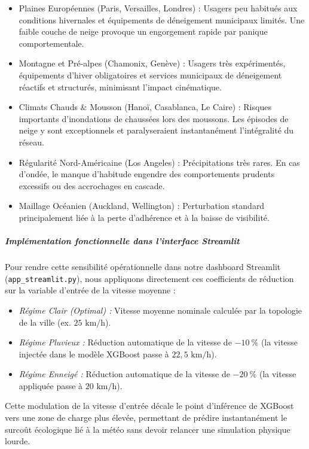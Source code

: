 \documentclass[10pt, a4paper]{article}
\providecommand{\tightlist}{}
\begin{document}
\begin{itemize}
\tightlist
\item
  Plaines Européennes (Paris, Versailles, Londres) : Usagers peu
  habitués aux conditions hivernales et équipements de déneigement
  municipaux limités. Une faible couche de neige provoque un engorgement
  rapide par panique comportementale.
\item
  Montagne et Pré-alpes (Chamonix, Genève) : Usagers très expérimentés,
  équipements d'hiver obligatoires et services municipaux de déneigement
  réactifs et structurés, minimisant l'impact cinématique.
\item
  Climats Chauds \& Mousson (Hanoï, Casablanca, Le Caire) : Risques
  importants d'inondations de chaussées lors des moussons. Les épisodes
  de neige y sont exceptionnels et paralyseraient instantanément
  l'intégralité du réseau.
\item
  Régularité Nord-Américaine (Los Angeles) : Précipitations très rares.
  En cas d'ondée, le manque d'habitude engendre des comportements
  prudents excessifs ou des accrochages en cascade.
\item
  Maillage Océanien (Auckland, Wellington) : Perturbation standard
  principalement liée à la perte d'adhérence et à la baisse de
  visibilité.
\end{itemize}

\subparagraph{Implémentation fonctionnelle dans l'interface
Streamlit}\label{impluxe9mentation-fonctionnelle-dans-linterface-streamlit}

Pour rendre cette sensibilité opérationnelle dans notre dashboard
Streamlit (\texttt{app\_streamlit.py}), nous appliquons directement ces
coefficients de réduction sur la variable d'entrée de la vitesse moyenne
:

\begin{itemize}
\tightlist
\item
  \emph{Régime Clair (Optimal) :} Vitesse moyenne nominale calculée par
  la topologie de la ville (ex. \(25\text{ km/h}\)).
\item
  \emph{Régime Pluvieux :} Réduction automatique de la vitesse de
  \(-10\ \%\) (la vitesse injectée dans le modèle XGBoost passe à
  \(22,5\text{ km/h}\)).
\item
  \emph{Régime Enneigé :} Réduction automatique de la vitesse de
  \(-20\ \%\) (la vitesse appliquée passe à \(20\text{ km/h}\)).
\end{itemize}

Cette modulation de la vitesse d'entrée décale le point d'inférence de
XGBoost vers une zone de charge plus élevée, permettant de prédire
instantanément le surcoût écologique lié à la météo sans devoir relancer
une simulation physique lourde.
\end{document}
